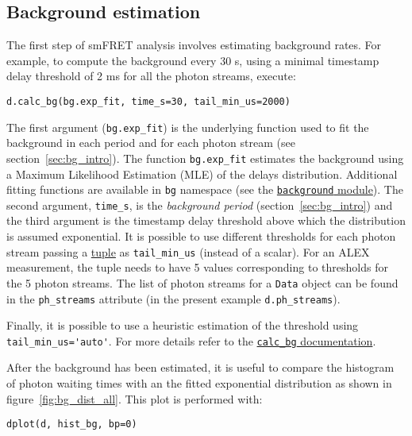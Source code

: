 \subsection{Background estimation}
\label{sec:bg_calc}

The first step of smFRET analysis involves estimating background rates.
For example, to compute the background every 30 s, using a minimal timestamp
delay threshold of 2 ms for all the photon streams, execute:

\begin{verbatim}
d.calc_bg(bg.exp_fit, time_s=30, tail_min_us=2000)
\end{verbatim}

The first argument (\verb|bg.exp_fit|) is the underlying function used to fit the
background in each period and for each photon stream (see section~\ref{sec:bg_intro}).
The function
\verb|bg.exp_fit| estimates the background using a Maximum Likelihood Estimation
(MLE) of the delays distribution. Additional fitting functions are available in
\verb|bg| namespace (see the
\href{http://fretbursts.readthedocs.org/en/latest/background.html}
{\texttt{background} module}). The second argument, \verb|time_s|, is the
\textit{background period} (section~\ref{sec:bg_intro}) and the third argument
is the timestamp delay threshold above which the distribution is assumed exponential.
It is possible to use different thresholds
for each photon stream passing a
\href{https://docs.python.org/2/tutorial/datastructures.html#tuples-and-sequences}{tuple}
as \verb|tail_min_us| (instead of a scalar).
For an ALEX measurement, the tuple needs to have 5 values
corresponding to thresholds for the 5 photon streams. The list of photon
streams for a \verb|Data| object can be found in the \verb|ph_streams|
attribute (in the present example \verb|d.ph_streams|).

Finally, it is possible to use a heuristic estimation of the threshold using
\verb|tail_min_us='auto'|. For more details refer to the
\href{http://fretbursts.readthedocs.org/en/latest/data\_class.html#fretbursts.burstlib.Data.calc\_bg}{\texttt{calc\_bg} documentation}.

After the background has been estimated, it is useful to compare the histogram of 
photon waiting times with an the fitted exponential distribution as shown in figure~\ref{fig:bg_dist_all}. 
This plot is performed with:

\begin{verbatim}
dplot(d, hist_bg, bp=0)
\end{verbatim}

